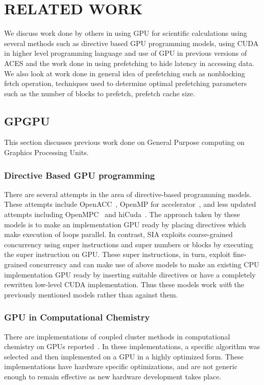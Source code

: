 \chapter{RELATED WORK}\label{lit}

We discuss work done by others in using GPU for scientific calculations using
several methods such as directive based GPU programming models, using CUDA in
higher level programming language and use of GPU in previous versions of ACES
and the work done in using prefetching to hide latency in accessing data. We also look
at work done in general idea of prefetching such as nonblocking fetch operation,
techniques used to determine optimal prefetching parameters such as the number of
blocks to prefetch, prefetch cache size.

\section{GPGPU}
This section discusses previous work done on General Purpose computing on Graphics
Processing Units.

\subsection{Directive Based GPU programming}
There are several attempts in the area of directive-based programming models. These
attempts include OpenACC~\cite{openacc}, OpenMP for
accelerator~\cite{openmpforaccelerators}, and less updated attempts including
OpenMPC~\cite{openmpc} and hiCuda~\cite{hicuda}. The approach taken by these models
is to make an implementation GPU ready by placing directives which make
execution of loops parallel. In contrast, SIA exploits coarse-grained
concurrency using super instructions and super numbers or blocks by executing
the super instruction on GPU. These super instructions, in turn, exploit fine-grained
concurrency and can make use of above models to make an existing CPU implementation
GPU ready by inserting suitable directives or have a completely rewritten low-level
CUDA implementation. Thus these models work \textit{with} the previously mentioned
models rather than against them.

\subsection{GPU in Computational Chemistry}
There are implementations of coupled cluster methods in computational chemistry
on GPUs reported~\cite{bhaskar2013}\cite{deprince2011}\cite{maw2011}. In these
implementations, a specific algorithm was selected and then implemented on a
GPU in a highly optimized form. These implementations have hardware specific
optimizations, and are not generic enough to remain effective as new hardware
development takes place.


